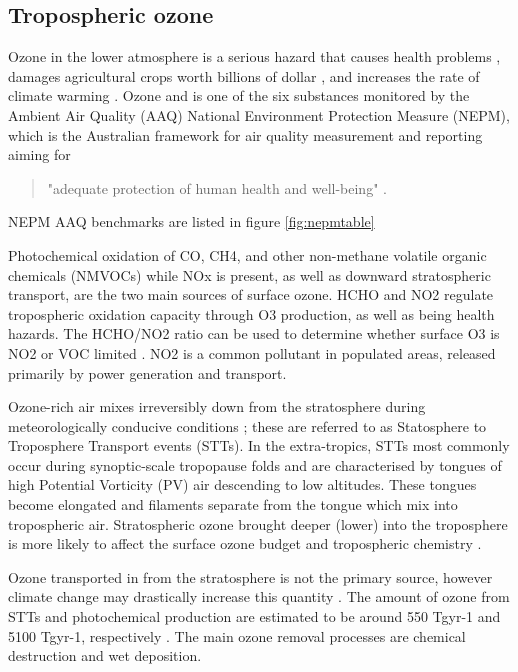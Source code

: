 \subsection{Tropospheric ozone}

Ozone in the lower atmosphere is a serious hazard that causes health problems \cite{Hsieh_2013}, damages agricultural crops worth billions of dollar \cite{Avnery_2011}, and increases the rate of climate warming \cite{IPCC_2013_chap8}. 
Ozone and is one of the six substances monitored by the Ambient Air Quality (AAQ) National Environment Protection Measure (NEPM), which is the Australian framework for air quality measurement and reporting aiming for \begin{quote}"adequate protection of human health and well-being" .\end{quote}
NEPM AAQ benchmarks are listed in figure \ref{fig:nepmtable}

Photochemical oxidation of CO, CH4, and other non-methane volatile organic chemicals (NMVOCs) while NOx is present, as well as downward stratospheric transport, are the two main sources of surface ozone.
HCHO and NO2 regulate tropospheric oxidation capacity through O3 production, as well as being health hazards.
The HCHO/NO2 ratio can be used to determine whether surface O3 is NO2 or VOC limited \cite{Mahajan_2015}.
NO2 is a common pollutant in populated areas, released primarily by power generation and transport. 

Ozone-rich air mixes irreversibly down from the stratosphere during meteorologically conducive conditions \citep{Sprenger2003,Mihalikova2012}; these are referred to as Statosphere to Troposphere Transport events (STTs).
In the extra-tropics, STTs most commonly occur during synoptic-scale tropopause folds \citep{Sprenger2003} and are characterised by tongues of high Potential Vorticity (PV) air descending to low altitudes.
These tongues become elongated and filaments separate from the tongue which mix into tropospheric air.
Stratospheric ozone brought deeper (lower) into the troposphere is more likely to affect the surface ozone budget and tropospheric chemistry \citep{Zanis2003,Langford_2009}.

Ozone transported in from the stratosphere is not the primary source, however climate change may drastically increase this quantity \cite{Hegglin_2009}.
The amount of ozone from STTs and photochemical production are estimated to be around 550 Tgyr-1 and 5100 Tgyr-1, respectively \cite{Stevenson_2006}. 
The main ozone removal processes are chemical destruction and wet deposition.
  
